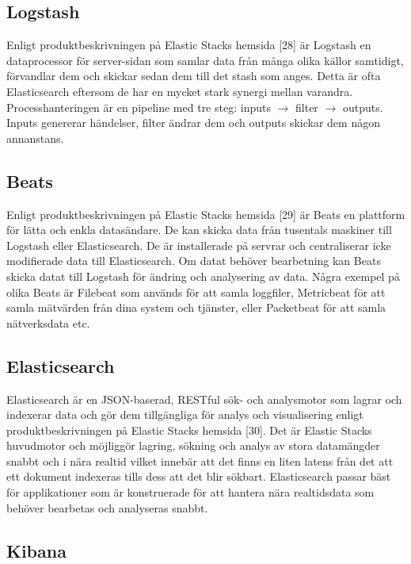 \documentclass{kththesis}
\begin{document}
\subsection{Logstash}

Enligt produktbeskrivningen på Elastic Stacks hemsida [28] är Logstash en dataprocessor för server-sidan som samlar data från många olika källor samtidigt, förvandlar dem och skickar sedan dem till det stash som anges. Detta är ofta Elasticsearch eftersom de har en mycket stark synergi mellan varandra. Processhanteringen är en pipeline med tre steg: inputs $\rightarrow$ filter $\rightarrow$ outputs. Inputs genererar händelser, filter ändrar dem och outputs skickar dem någon annanstans. 

\subsection{Beats}

Enligt produktbeskrivningen på Elastic Stacks hemsida [29] är Beats en plattform för lätta och enkla datasändare. De kan skicka data från tusentals maskiner till Logstash eller Elasticsearch. De är installerade på servrar och centraliserar icke modifierade data till Elasticsearch. Om datat behöver bearbetning kan Beats skicka datat till Logstash för ändring och analysering av data. Några exempel på olika Beats är Filebeat som används för att samla loggfiler, Metricbeat för att samla mätvärden från dina system och tjänster, eller Packetbeat för att samla nätverksdata etc. 

\subsection{Elasticsearch}

Elasticsearch är en JSON-baserad, RESTful sök- och analysmotor som lagrar och indexerar data och gör dem tillgängliga för analys och visualisering enligt produktbeskrivningen på Elastic Stacks hemsida [30]. Det är Elastic Stacks huvudmotor och möjliggör lagring, sökning och analys av stora datamängder snabbt och i nära realtid vilket innebär att det finns en liten latens från det att ett dokument indexeras tills dess att det blir sökbart. Elasticsearch passar bäst för applikationer som är konstruerade för att hantera nära realtidsdata som behöver bearbetas och analyseras snabbt. 

\subsection{Kibana}
\end{document}
